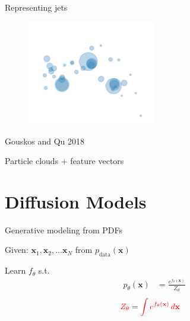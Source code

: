 \documentclass[aspectratio=169,xcolor=dvipsnames]{beamer}
\newcommand{\bx}{\mathbf{x}}
\begin{document}
\begin{frame}{Representing jets}

  \begin{figure}
    \centering
    \includegraphics[width=0.5\textwidth]{figs/point-cloud-Gouskos-2018.png}
  \end{figure}
  \begin{center}
    \tiny{Gouskos and Qu 2018}
  \end{center}

  \pause
  \centering
  Particle clouds + feature vectors
  
\end{frame}

\section{Diffusion Models}
\begin{frame}{Generative modeling from PDFs}

Given: $\bx_1, \bx_2, \dots \bx_N$ from $p_\text{data}(\bx)$
\vspace{0.25cm}
\pause

Learn $f_\theta$ s.t.
\begin{eqnarray*}
    p_{\theta}(\bx) &= \frac{e^{f_\theta(\bx)}}{Z_\theta}
\end{eqnarray*}
\pause
\begin{align*}
    \textcolor{red}{Z_\theta} &= \textcolor{red}{\int e^{f_\theta(\bx)} \,d\bx}
\end{align*}

\end{frame}
\end{document}
